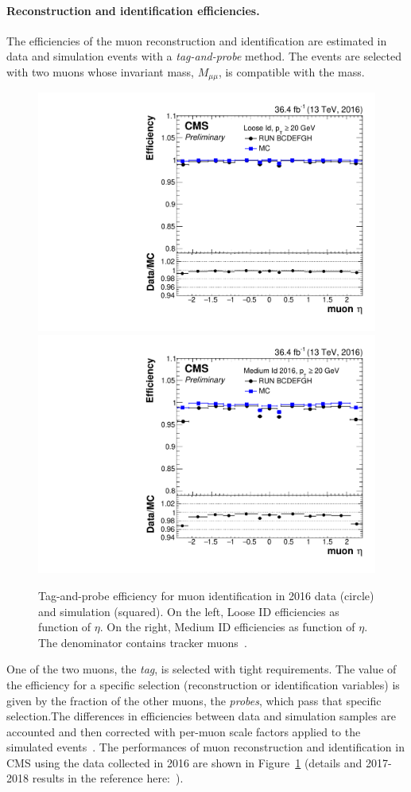 \paragraph{Reconstruction and identification
  efficiencies.}\label{sec:c2effmuon}

The efficiencies of the muon reconstruction and identification are
estimated in data and simulation events with a \emph{tag-and-probe}
method. The events are selected with two muons whose invariant mass,
$M_{\mu \mu}$, is compatible with the \PZ mass. 
\begin{figure}[h!]
\centering
\includegraphics[width=.45\textwidth]{Figures/c2/TnP_MC_NUM_LooseID_DEN_genTracks_PAR_eta_.pdf}
\includegraphics[width=.48\textwidth]{Figures/c2/TnP_MC_NUM_MediumID2016_DEN_genTracks_PAR_eta_.pdf}
\caption{Tag-and-probe efficiency for muon identification in 2016 data
  (circle) and simulation (squared). On the left, Loose ID efficiencies as function of $\eta$. 
On the right, Medium ID efficiencies as function of $\eta$. The
  denominator contains tracker muons~\cite{CMS-DP-2017-007}.}
\label{fig:2016eff}
\end{figure}
One of the two muons,
the \emph{tag}, is selected with tight requirements. The value of the
efficiency for a specific selection (reconstruction or identification
variables) is given by the fraction of the other muons, the
\emph{probes}, which pass that specific selection.The differences in
efficiencies between data and simulation samples are accounted and
then corrected with per-muon scale factors applied to the simulated
events~\cite{Sirunyan_2018_muon}. The performances of muon
reconstruction and identification in CMS using the data collected in
2016 are shown in Figure~\ref{fig:2016eff} (details and 2017-2018
results in the reference
here:~\cite{CMS-DP-2017-007,CMS-DP-2018-042}).

